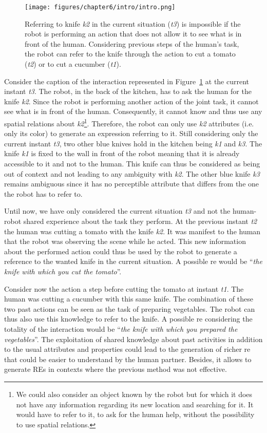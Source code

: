 \begin{figure}[ht!]
\centering
\texttt{[image: figures/chapter6/intro/intro.png]}
\caption{\label{fig:chap6_intro} Referring to knife \textit{k2} in the current situation (\textit{t3}) is impossible if the robot is performing an action that does not allow it to see what is in front of the human. Considering previous steps of the human's task, the robot can refer to the knife through the action to cut a tomato (\textit{t2}) or to cut a cucumber (\textit{t1}).}
\end{figure}

Consider the caption of the interaction represented in Figure~\ref{fig:chap6_intro} at the current instant \textit{t3}. The robot, in the back of the kitchen, has to ask the human for the knife \textit{k2}. Since the robot is performing another action of the joint task, it cannot see what is in front of the human. Consequently, it cannot know and thus use any spatial relations about \textit{k2}\footnote{We could also consider an object known by the robot but for which it does not have any information regarding its new location and searching for it. It would have to refer to it, to ask for the human help, without the possibility to use spatial relations.}. Therefore, the robot can only use \textit{k2} attributes (i.e. only its color) to generate an expression referring to it. Still considering only the current instant \textit{t3}, two other blue knives hold in the kitchen being \textit{k1} and \textit{k3}. The knife \textit{k1} is fixed to the wall in front of the robot meaning that it is already accessible to it and not to the human. This knife can thus be considered as being out of context and not leading to any ambiguity with \textit{k2}. The other blue knife \textit{k3} remains ambiguous since it has no perceptible attribute that differs from the one the robot has to refer to.

Until now, we have only considered the current situation \textit{t3} and not the human-robot shared experience about the task they perform. At the previous instant \textit{t2} the human was cutting a tomato with the knife \textit{k2}. It was manifest to the human that the robot was observing the scene while he acted. This new information about the performed action could thus be used by the robot to generate a reference to the wanted knife in the current situation. A possible \acrshort{re} would be ``\textit{the knife with which you cut the tomato}''. 

Consider now the action a step before cutting the tomato at instant \textit{t1}. The human was cutting a cucumber with this same knife. The combination of these two past actions can be seen as the task of preparing vegetables. The robot can thus also use this knowledge to refer to the knife. A possible \acrshort{re} considering the totality of the interaction would be ``\textit{the knife with which you prepared the vegetables}''. The exploitation of shared knowledge about past activities in addition to the usual attributes and properties could lead to the generation of richer \acrshort{re} that could be easier to understand by the human partner. Besides, it allows to generate REs in contexts where the previous method was not effective.

